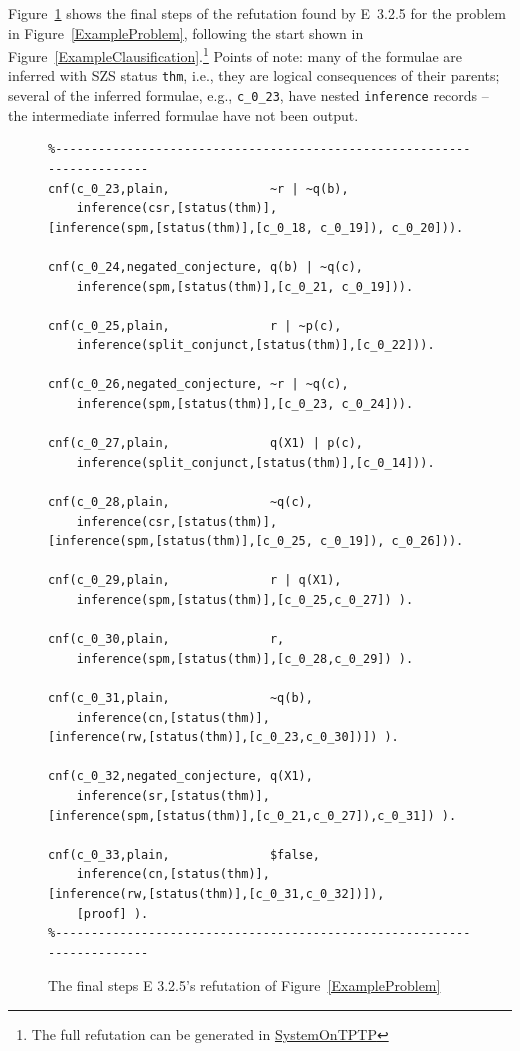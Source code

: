 \documentclass[runningheads]{llncs}
\newcommand{\smalltt}[1]{\small \texttt{#1}}
\begin{document}
Figure~\ref{ExampleDerivation} shows the final steps of the refutation found by E~3.2.5 for the
problem in Figure~\ref{ExampleProblem}, following the start shown in 
Figure~\ref{ExampleClausification}.\footnote{%
The full refutation can be generated in \href{https://tptp.org/cgi-bin/SystemOnTPTP}{SystemOnTPTP}}
Points of note:
many of the formulae are inferred with SZS status {\smalltt{thm}}, i.e., they are logical 
consequences of their parents;
several of the inferred formulae, e.g., {\smalltt{c\_0\_23}}, have nested {\smalltt{inference}}
records -- the intermediate inferred formulae have not been output. 

\begin{figure}[htb]
\centering
{\footnotesize
{\setlength{\baselineskip}{3mm}
\begin{verbatim}
%------------------------------------------------------------------------
cnf(c_0_23,plain,              ~r | ~q(b),
    inference(csr,[status(thm)],
[inference(spm,[status(thm)],[c_0_18, c_0_19]), c_0_20])).

cnf(c_0_24,negated_conjecture, q(b) | ~q(c),
    inference(spm,[status(thm)],[c_0_21, c_0_19])).

cnf(c_0_25,plain,              r | ~p(c),
    inference(split_conjunct,[status(thm)],[c_0_22])).

cnf(c_0_26,negated_conjecture, ~r | ~q(c),
    inference(spm,[status(thm)],[c_0_23, c_0_24])).

cnf(c_0_27,plain,              q(X1) | p(c),
    inference(split_conjunct,[status(thm)],[c_0_14])).

cnf(c_0_28,plain,              ~q(c),
    inference(csr,[status(thm)],
[inference(spm,[status(thm)],[c_0_25, c_0_19]), c_0_26])).

cnf(c_0_29,plain,              r | q(X1),
    inference(spm,[status(thm)],[c_0_25,c_0_27]) ).

cnf(c_0_30,plain,              r,
    inference(spm,[status(thm)],[c_0_28,c_0_29]) ).

cnf(c_0_31,plain,              ~q(b),
    inference(cn,[status(thm)],
[inference(rw,[status(thm)],[c_0_23,c_0_30])]) ).

cnf(c_0_32,negated_conjecture, q(X1),
    inference(sr,[status(thm)],
[inference(spm,[status(thm)],[c_0_21,c_0_27]),c_0_31]) ).

cnf(c_0_33,plain,              $false,
    inference(cn,[status(thm)],
[inference(rw,[status(thm)],[c_0_31,c_0_32])]),
    [proof] ).
%------------------------------------------------------------------------
\end{verbatim}
}}
\caption{The final steps E 3.2.5's refutation of Figure~\ref{ExampleProblem}}
\label{ExampleDerivation}
\end{figure}
\end{document}
